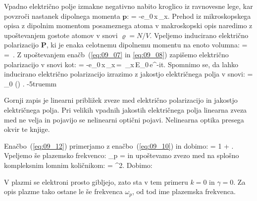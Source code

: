 Vpadno električno polje izmakne negativno nabito kroglico iz ravnovesne 
lege, kar povzroči nastanek dipolnega momenta $\mathbf{p}$:
\beq
{} = -e_0\,x\,_x.
\label{eq:09_08}
\eeq
Prehod iz mikroskopskega opisa z dipolnim momentom posameznega atoma 
v makroskopski opis naredimo z upoštevanjem gostote atomov v snovi 
$\varrho = N/V$. Vpeljemo inducirano električno polarizacijo $\mathbf{P}$, ki 
je enaka celotnemu dipolnemu momentu na enoto volumna:
\beq
{} =  = \,\varrho. 
\label{eq:09_09}
\eeq
Z upoštevanjem enačb~(\ref{eq:09_07} in \ref{eq:09_08}) zapišemo 
električno polarizacijo v snovi kot:
\beq
{} = -e_0\,x\,_x\,\varrho = \,_x\,E_0\,e^{-i\omega t}.
\label{eq:09_10}
\eeq
Spomnimo se, da lahko inducirano električno polarizacijo izrazimo z jakostjo
električnega polja v snovi:
\beq
{} = \varepsilon_0 () .
\label{eq:09_12}
\eeq
\vglue-5truemm
\begin{remark}
Gornji zapis je linearni približek zveze med električno polarizacijo in 
jakostjo električnega polja. Pri velikih vpadnih jakostih električnega polja linearna zveza 
med ne velja in pojavijo se nelinearni optični pojavi. Nelinearna optika presega okvir te knjige.
\end{remark}

Enačbo~(\ref{eq:09_12}) primerjamo z enačbo~(\ref{eq:09_10}) in dobimo:
\beq
\varepsilon= 1 + .
\label{eq:09_13}
\eeq
Vpeljemo še plazemsko frekvenco:
\beq
\omega_p = 
\label{eq:09_14}
\eeq
in upoštevamo zvezo med na splošno kompleksnim lomnim količnikom:
\beq
\varepsilon = ^2.
\label{eq:09_15}
\eeq
Dobimo:
\begin{remark}
V plazmi se elektroni prosto gibljejo, zato sta v tem primeru $k=0$ in $\gamma = 0$. 
Za opis plazme tako ostane le še frekvenca $\omega_p$, od tod ime plazemska frekvenca. \end{remark}

